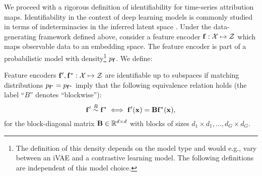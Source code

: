     We proceed with a rigorous definition of identifiability for time-series attribution maps. Identifiability in the context of deep learning models is commonly studied in terms of indeterminacies in the inferred latent space \citep{khemakhem2020variational, roeder2021linear}.
    Under the data-generating framework defined above, consider a feature encoder $\mathbf{f}: \mathcal{X} \mapsto \mathcal{Z}$ which maps observable data to an embedding space. The feature encoder is part of a probabilistic model with density\footnote{The definition of this density depends on the model type and would e.g., vary between an iVAE \citep{khemakhem2020variational} and a contrastive learning model. The following definitions are independent of this model choice.} $p_{\mathbf{f}}$.
    We define:
    \begin{definition}
        Feature encoders $\mathbf{f}', \mathbf{f}^*: \mathcal X \mapsto \mathcal Z$ are identifiable up to subspaces if matching distributions $p_{\mathbf{f}'} = p_{\mathbf{f}^*}$ imply that the following equivalence relation holds (the label ``$B$'' denotes ``blockwise''):
        \begin{equation}
            \mathbf{f}' \mathrel{\mathop{\sim}^B} \mathbf{f}^*
            \iff
            \mathbf{f}'(\mathbf x) = \mathbf{B} \mathbf{f}^*(\mathbf x),
        \end{equation}
        for the block-diagonal matrix $\mathbf{B} \in \mathbb{R}^{d \times d}$ with blocks of sizes $d_1 \times d_1, \dots, d_G \times d_G$.
    \end{definition}


